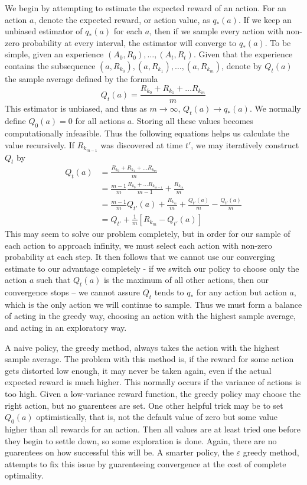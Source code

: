 \documentclass{report}
\begin{document}
We begin by attempting to estimate the expected reward of an action. For an action $a$, denote the expected reward, or action value, as $q_*(a)$. If we keep an unbiased estimator of $q_*(a)$ for each $a$, then if we sample every action with non-zero probability at every interval, the estimator will converge to $q_*(a)$. To be simple, given an experience $(A_0,R_0), \dots, (A_t,R_t)$. Given that the experience contains the subsequence $(a, R_{k_0}), (a, R_{k_1}), \dots, (a, R_{k_m})$, denote by $Q_t(a)$ the sample average defined by the formula
%
\[ Q_t(a) = \frac{R_{k_0} + R_{k_1} + \dots R_{k_m}}{m} \]
%
\noindent This estimator is unbiased, and thus as $m \to \infty$, $Q_t(a) \to q_*(a)$. We normally define $Q_0(a) = 0$ for all actions $a$. Storing all these values becomes computationally infeasible. Thus the following equations helps us calculate the value recursively. If $R_{k_{m-1}}$ was discovered at time $t'$, we may iteratively construct $Q_{t}$ by
%
\begin{align*}
    Q_t(a) &= \frac{R_{k_0} + R_{k_1} + \dots R_{k_m}}{m}\\
           &= \frac{m-1}{m} \frac{R_{k_0} + \dots R_{k_{m-1}}}{m-1} + \frac{R_{k_m}}{m}\\
           &= \frac{m-1}{m} Q_{t'}(a) + \frac{R_{k_m}}{m} + \frac{Q_{t'}(a)}{m} - \frac{Q_{t'}(a)}{m}\\
           &= Q_{t'} + \frac{1}{m} [R_{k_m} - Q_{t'}(a)]
\end{align*}
%
This may seem to solve our problem completely, but in order for our sample of each action to approach infinity, we must select each action with non-zero probability at each step. It then follows that we cannot use our converging estimate to our advantage completely - if we switch our policy to choose only the action $a$ such that $Q_t(a)$ is the maximum of all other actions, then our convergence stops -- we cannot assure $Q_t$ tends to $q_*$ for any action but action $a$, which is the only action we will continue to sample. Thus we must form a balance of acting in the greedy way, choosing an action with the highest sample average, and acting in an exploratory way.

A naive policy, the greedy method, always takes the action with the highest sample average. The problem with this method is, if the reward for some action gets distorted low enough, it may never be taken again, even if the actual expected reward is much higher. This normally occurs if the variance of actions is too high. Given a low-variance reward function, the greedy policy may choose the right action, but no guarentees are set. One other helpful trick may be to set $Q_0(a)$ optimistically, that is, not the default value of zero but some value higher than all rewards for an action. Then all values are at least tried one before they begin to settle down, so some exploration is done. Again, there are no guarentees on how successful this will be. A smarter policy, the $\varepsilon$ greedy method, attempts to fix this issue by guarenteeing convergence at the cost of complete optimality.
\end{document}
